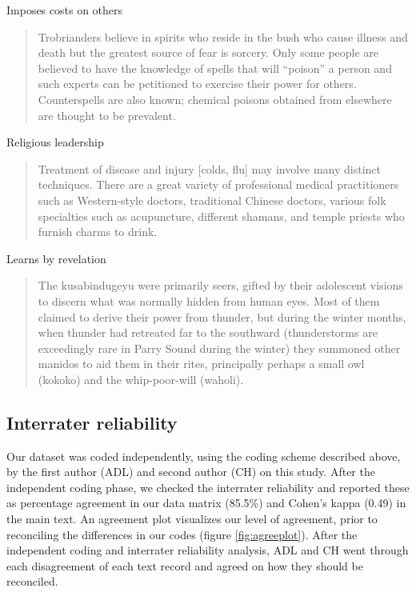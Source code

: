 \documentclass[
]{article}
\begin{document}
Imposes costs on others

\begin{quote}
Trobrianders believe in spirits who reside in the bush who cause illness and death but the greatest source of fear is sorcery. Only some people are believed to have the knowledge of spells that will ``poison'' a person and such experts can be petitioned to exercise their power for others. Counterspells are also known; chemical poisons obtained from elsewhere are thought to be prevalent.
\end{quote}

Religious leadership

\begin{quote}
Treatment of disease and injury {[}colds, flu{]} may involve many distinct techniques. There are a great variety of professional medical practitioners such as Western-style doctors, traditional Chinese doctors, various folk specialties such as acupuncture, different shamans, and temple priests who furnish charms to drink.
\end{quote}

Learns by revelation

\begin{quote}
The kusabindugeyu were primarily seers, gifted by their adolescent visions to discern what was normally hidden from human eyes. Most of them claimed to derive their power from thunder, but during the winter months, when thunder had retreated far to the southward (thunderstorms are exceedingly rare in Parry Sound during the winter) they summoned other manidos to aid them in their rites, principally perhaps a small owl (kokoko) and the whip-poor-will (waholi).
\end{quote}

\hypertarget{interrater-reliability}{%
\subsection{Interrater reliability}\label{interrater-reliability}}

Our dataset was coded independently, using the coding scheme described above, by the first author (ADL) and second author (CH) on this study. After the independent coding phase, we checked the interrater reliability and reported these as percentage agreement in our data matrix (85.5\%) and Cohen's kappa (0.49) in the main text. An agreement plot visualizes our level of agreement, prior to reconciling the differences in our codes (figure \ref{fig:agreeplot}). After the independent coding and interrater reliability analysis, ADL and CH went through each disagreement of each text record and agreed on how they should be reconciled.
\end{document}
